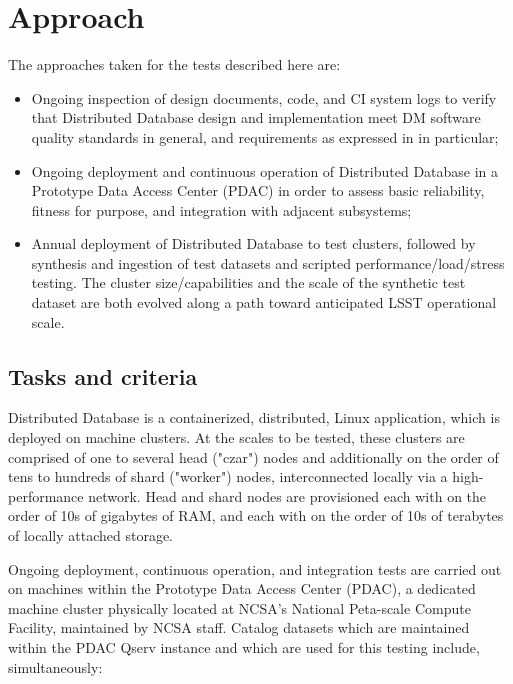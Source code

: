 \documentclass[DM,lsstdraft,STS,toc]{lsstdoc}
\def\product{Distributed Database}
\begin{document}
\newpage
\section{Approach}
\label{sec:approach}

The approaches taken for the tests described here are:

\begin{itemize}

  \item{Ongoing inspection of design documents, code, and CI system logs to verify that \product{} design
  and implementation meet DM software quality standards in general, and requirements as expressed in
   in particular;}

  \item{Ongoing deployment and continuous operation of \product{} in a Prototype Data Access Center
  (PDAC) in order to assess basic reliability, fitness for purpose, and integration with adjacent
  subsystems;}

  \item{Annual deployment of \product{} to test clusters, followed by synthesis and ingestion
  of test datasets and scripted performance/load/stress testing. The cluster size/capabilities and the
  scale of the synthetic test dataset are both evolved along a path toward anticipated LSST operational
  scale.}

\end{itemize}

\subsection{Tasks and criteria}
\label{sec:tasks}

\product{} is a containerized, distributed, Linux application, which is deployed on machine clusters.
At the scales to be tested, these clusters are comprised of one to several head ("czar") nodes and
additionally on the order of tens to hundreds of shard ("worker") nodes, interconnected locally via a
high-performance network. Head and shard nodes are provisioned each with on the order of 10s of gigabytes of
RAM, and each with on the order of 10s of terabytes of locally attached storage.

Ongoing deployment, continuous operation, and integration tests are carried out on machines within the
Prototype Data Access Center (PDAC), a dedicated machine cluster physically located at NCSA's National
Peta-scale Compute Facility, maintained by NCSA staff. Catalog datasets which are maintained within
the PDAC Qserv instance and which are used for this testing include, simultaneously:
\end{document}
